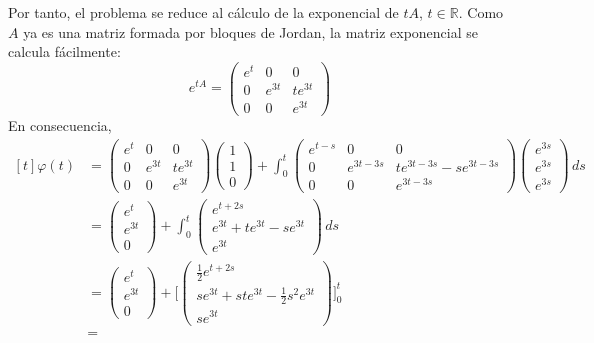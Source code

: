 \documentclass[11pt]{report}
\newcommand{\R}{\mathbb R}
\begin{document}
Por tanto, el problema se reduce al cálculo de la exponencial de $tA$, $t \in \R$. Como $A$ ya es una matriz formada por bloques de Jordan, la matriz exponencial se calcula fácilmente:
\[e^{tA} = \begin{pmatrix}
    e^{t} & 0 & 0 \\
    0 & e^{3t} & te^{3t} \\
    0 & 0 & e^{3t}
\end{pmatrix}\]
En consecuencia,
\[\begin{aligned}[t]\varphi(t) &=
\begin{pmatrix}
    e^{t} & 0 & 0 \\
    0 & e^{3t} & te^{3t} \\
    0 & 0 & e^{3t}
\end{pmatrix}\begin{pmatrix}
    1 \\
    1 \\
    0
\end{pmatrix}+\int_0^t\begin{pmatrix}
    e^{t-s} & 0 & 0 \\
    0 & e^{3t-3s} & te^{3t-3s}-se^{3t-3s} \\
    0 & 0 & e^{3t-3s}
\end{pmatrix}\begin{pmatrix}
    e^{3s}\\
    e^{3s}\\
    e^{3s}
\end{pmatrix} \, ds\\
&=\begin{pmatrix}
    e^t\\
    e^{3t} \\
    0
\end{pmatrix}+\int_0^t \begin{pmatrix}
    e^{t+2s}\\
    e^{3t}+te^{3t}-se^{3t} \\
    e^{3t}
\end{pmatrix} \, ds \\
&=\begin{pmatrix}
    e^t\\
    e^{3t} \\
    0
\end{pmatrix}+\biggl[\begin{pmatrix}
    \frac{1}{2}e^{t+2s}\\
    se^{3t}+ste^{3t}-\frac{1}{2}s^2e^{3t}\\
    se^{3t}
\end{pmatrix}\biggr]_0^t \\ &=

\end{aligned}\]
\end{document}

